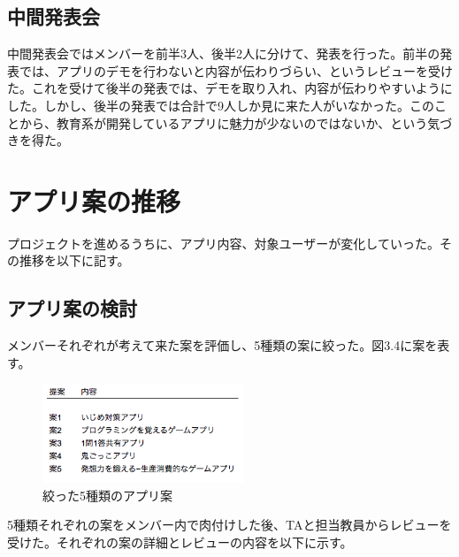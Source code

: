 \documentclass[openany,11pt,papersize]{jsbook}
\begin{document}

\subsection{中間発表会}
\par 中間発表会ではメンバーを前半3人、後半2人に分けて、発表を行った。前半の発表では、アプリのデモを行わないと内容が伝わりづらい、というレビューを受けた。これを受けて後半の発表では、デモを取り入れ、内容が伝わりやすいようにした。しかし、後半の発表では合計で9人しか見に来た人がいなかった。このことから、教育系が開発しているアプリに魅力が少ないのではないか、という気づきを得た。


\section{アプリ案の推移}
\par プロジェクトを進めるうちに、アプリ内容、対象ユーザーが変化していった。その推移を以下に記す。

\subsection{アプリ案の検討}
\par メンバーそれぞれが考えて来た案を評価し、5種類の案に絞った。図3.4に案を表す。

\begin{figure}[H]
\begin{center}
\includegraphics[width=6cm, bb=0 0 329 162]{img/AppIdea.png}
\end{center}
\caption{絞った5種類のアプリ案}
\end{figure}

\par 5種類それぞれの案をメンバー内で肉付けした後、TAと担当教員からレビューを受けた。それぞれの案の詳細とレビューの内容を以下に示す。
\end{document}
